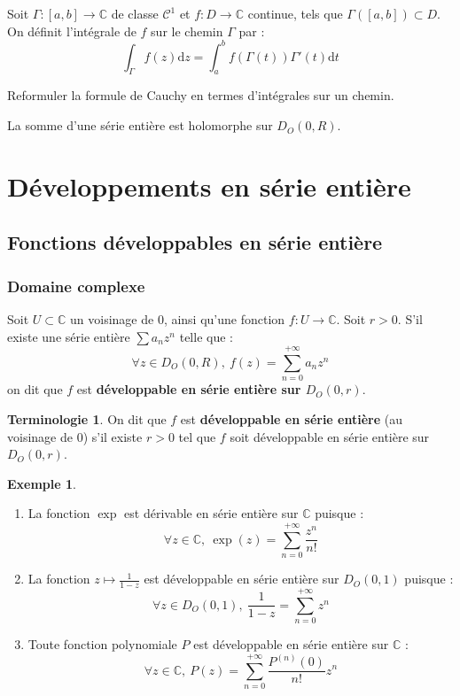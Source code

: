 \documentclass[french]{article}
\newcommand{\C}{\mathbb{C}}
\renewcommand{\d}{\text{d}}
\theoremstyle{plain}
\theoremstyle{definition}
\newtheorem*{ex}{Exemple}
\newtheorem*{terminologie}{Terminologie}
\theoremstyle{remark}
\begin{document}
\begin{dfn}
	Soit $\Gamma:[a,b]\to\C$ de classe $\mathcal{C}^1$ et $f:D\to\C$ continue, tels que $\Gamma([a,b])\subset D$. On définit l'intégrale de $f$ sur le chemin $\Gamma$ par : $$\int_\Gamma f(z)\d z=\int_{a}^{b}f(\Gamma(t))\Gamma'(t)\d t$$
\end{dfn}

\begin{exo}
	Reformuler la formule de Cauchy en termes d'intégrales sur un chemin.
\end{exo}

\begin{prop}%
	La somme d'une série entière est holomorphe sur $D_O(0,R)$.
\end{prop}

\section{Développements en série entière}

\subsection{Fonctions développables en série entière}

\subsubsection*{Domaine complexe}

\begin{dfn}
	Soit $U\subset\C$ un voisinage de $0$, ainsi qu'une fonction $f:U\to\C$. Soit $r>0$. S'il existe une série entière $\displaystyle\sum a_nz^n$ telle que : $$\forall z\in D_O(0,R),\ f(z)=\sum_{n=0}^{+\infty}a_nz^n$$ on dit que $f$ est \textbf{développable en série entière sur $D_O(0,r)$}.
\end{dfn}

\begin{terminologie}
	On dit que $f$ est \textbf{développable en série entière} (au voisinage de $0$) s'il existe $r>0$ tel que $f$ soit développable en série entière sur $D_O(0,r)$.
\end{terminologie}

\begin{ex}%
	\begin{enumerate}
		\item La fonction $\exp$ est dérivable en série entière sur $\C$ puisque : $$\forall z\in\C,\ \exp(z)=\displaystyle\sum_{n=0}^{+\infty}\frac{z^n}{n!}$$
		\item La fonction $z\mapsto\displaystyle\frac{1}{1-z}$ est développable en série entière sur $D_O(0,1)$ puisque : $$\forall z\in D_O(0,1),\ \frac{1}{1-z}=\sum_{n=0}^{+\infty}z^n$$
		\item Toute fonction polynomiale $P$ est développable en série entière sur $\C$ : $$\forall z\in\C,\ P(z)=\sum_{n=0}^{+\infty}\frac{P^{(n)}(0)}{n!}z^n$$
	\end{enumerate}
\end{ex}
\end{document}
